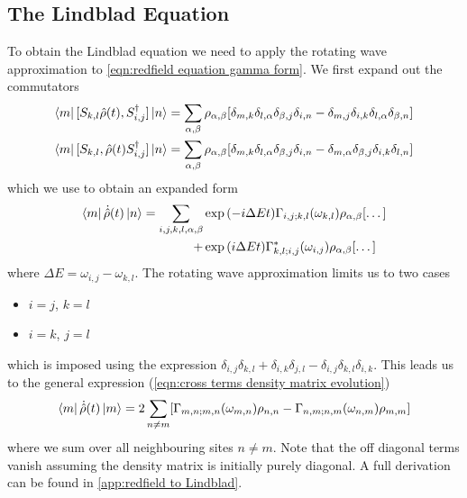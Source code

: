 \subsection{The Lindblad Equation}\label{sec:Lindblad equation}
To obtain the Lindblad equation
we need to apply the rotating
wave approximation to
\cref{eqn:redfield equation gamma form}.
We first expand out the commutators
\begin{align}
    \bra{m}[S_{k, l}\hat{\rho}(t),
    S^\dagger_{i, j}] \ket{n}              & =
    \sum_{\alpha, \beta} \rho_{\alpha, \beta} [
        \delta_{m, k}\delta_{l, \alpha}
        \delta_{\beta, j}\delta_{i, n}
        -\delta_{m, j}\delta_{i, k}
    \delta_{l, \alpha}\delta_{\beta, n}]       \\
    \bra{m}[S_{k, l},
    \hat{\rho}(t)S^\dagger_{i, j}] \ket{n} & =
    \sum_{\alpha, \beta} \rho_{\alpha, \beta} [
        \delta_{m, k}\delta_{l, \alpha}
        \delta_{\beta, j}\delta_{i, n}
        -\delta_{m, \alpha}\delta_{\beta, j}
        \delta_{i, k}\delta_{l, n}]
\end{align}
which we use to obtain an expanded
form
\begin{equation}
    \bra{m}\dot{\hat{\rho}}(t) \ket{n} = \begin{aligned}[t]
        \sum_{i,j,k, l, \alpha, \beta} &
        \exp{(-i\Delta{}Et)}
        \Gamma_{i,j;k, l}(\omega_{k,l})
        \rho_{\alpha, \beta} [\dots]                          \\
        +                              & \exp{(i\Delta{}E t)}
        \Gamma^*_{k, l; i,j}(\omega_{i,j})
        \rho_{\alpha, \beta} [\dots]
    \end{aligned}
\end{equation}
where \(\Delta{}E = \omega_{i,j}-\omega_{k,l}\).
The rotating wave approximation
limits us to two cases
\begin{itemize}
    \item \(i=j\), \(k=l\)
    \item \(i=k\), \(j=l\)
\end{itemize}
which is imposed using the expression
\(\delta_{i,j}\delta_{k,l}
+ \delta_{i,k}\delta_{j,l}
- \delta_{i,j}\delta_{k,l}
\delta_{i,k}\). This
leads us to the
general expression (\cref{eqn:cross terms density matrix evolution})
\begin{equation}
    \bra{m}\dot{\hat{\rho}}(t) \ket{m}  =
    2 \sum_{n\neq m}
    [  \Gamma_{m,n;m, n}(\omega_{m,n})\rho_{n, n}
        - \Gamma_{n,m;n, m}(\omega_{n,m})\rho_{m, m}]
\end{equation}
where we sum over all neighbouring
sites \(n \neq m\). Note that
the off diagonal
terms vanish assuming the
density matrix is initially
purely diagonal. A full derivation
can be found in
\cref{app:redfield to Lindblad}.



